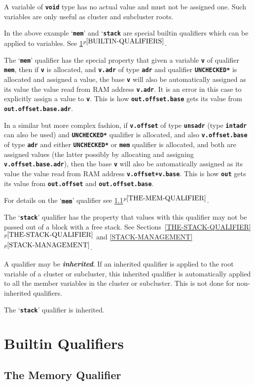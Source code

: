 \documentclass[12pt]{article}
\newcommand{\TT}[1]{{\tt \bfseries #1}}
\newcommand{\ikey}[2]{{\bf \em #1}\index{#2}}
\newcommand{\itemref}[1]{\ref{#1}$^{p\pageref{#1}}$}
\newcommand{\EOL}{\penalty \exhyphenpenalty}
\begin{document}
A variable of \TT{void} type has no actual value
and must not be assigned one.  Such variables are only useful
as cluster and subcluster roots.

In the above example `\TT{mem}' and `\TT{stack} are special builtin qualifiers
which can be applied to variables.
See \itemref{BUILTIN-QUALIFIERS}.

The `\TT{mem}' qualifier has the special property that given a variable
\TT{v} of qualifier \TT{mem}, then if \TT{v} is allocated,
and \TT{v.adr} of type \TT{adr} and qualifier \TT{*UNCHECKED*}
is allocated and
assigned a value, the base \TT{v} will also be automatically
assigned as its value the value read from RAM address \TT{v.adr}.
It is an error in this case to explicitly assign a value to \TT{v}.
This is how \TT{out.offset\EOL .base} gets its value from \TT{out.offset.base.adr}.

In a similar but more complex fashion, if \TT{v.offset} of type
\TT{unsadr} (type \TT{intadr} can also be used) and \TT{*UNCHECKED*}
qualifier is allocated, and also \TT{v.offset.base} of type \TT{adr}
and either \TT{*UNCHECKED*} or \TT{mem} qualifier is allocated,
and both are assigned values (the latter possibly by allocating
and assigning \TT{v.offset.base.adr}), then
the base \TT{v} will also be automatically
assigned as its value the value read from RAM address \TT{v.offset+v.base}.
This is how \TT{out} gets its value from \TT{out.offset}
and \TT{out.offset.base}.

For details on the `\TT{mem}' qualifier see \itemref{THE-MEM-QUALIFIER}.

The `\TT{stack}' qualifier has the property that values with
this qualifier may not be passed out of a block with a free
stack.  See Sections~\itemref{THE-STACK-QUALIFIER} and
\itemref{STACK-MANAGEMENT}.

A qualifier may be \ikey{inherited}{qualifier}\label{INHERITED-QUALIFIER}.
If an inherited qualifier
is applied to the root variable of a cluster
or subcluster, this inherited qualifier is automatically applied to all
the member variables in the cluster or subcluster.  This is not done
for non-inherited qualifiers.

The `\TT{stack}' qualifier is inherited.

\section{Builtin Qualifiers}
\label{BUILTIN-QUALIFIERS}

\subsection{The Memory Qualifier}
\label{THE-MEM-QUALIFIER}
\end{document}
